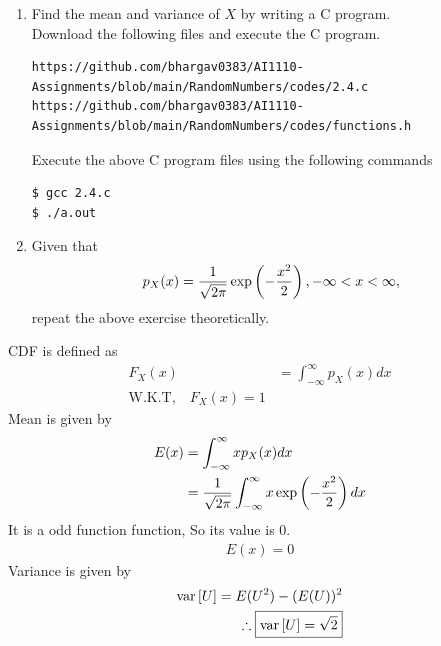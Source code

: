 \documentclass[journal,12pt,twocolumn]{IEEEtran}
\begin{document}
\begin{enumerate}[label=\thesection.\arabic*
,ref=\thesection.\theenumi]
\item Find the mean and variance of $X$ by writing a C program.\\
\solution Download the following files and execute the  C program.
\begin{lstlisting}
https://github.com/bhargav0383/AI1110-Assignments/blob/main/RandomNumbers/codes/2.4.c
https://github.com/bhargav0383/AI1110-Assignments/blob/main/RandomNumbers/codes/functions.h
\end{lstlisting}
Execute the above C program files using the following commands
\begin{lstlisting}
$ gcc 2.4.c
$ ./a.out
\end{lstlisting}

\item Given that 
\begin{align}
p_{X}(x) = \frac{1}{\sqrt{2\pi}}\exp\left(-\frac{x^2}{2}\right), -\infty < x < \infty,
\end{align}
repeat the above exercise theoretically.
\end{enumerate}
\solution 
CDF is defined as
    \begin{align}
        F_X(x)&=\int_{-\infty}^{\infty}p_X(x)dx\\
        \text{W.K.T,} \quad \boxed{F_X(x)=1}
    \end{align}
Mean is given by
    \begin{align}
        E(x)&=\int_{-\infty}^{\infty}xp_X(x)dx\\\
            &=\frac{1}{\sqrt{2\pi}}\int_{-\infty}^{\infty}x\exp\left(-\frac{x^2}{2}\right)dx
    \end{align}
    It is a odd function function, So its value is 0.
    \begin{align}
        \boxed{E(x)=0}
    \end{align}
Variance is given by
    \begin{align}
        \text{var}{}\left[U\right]=E(U^2)-(E(U))^2\\
        \therefore \boxed{\text{var}{}\left[U\right]=\sqrt{2}}
    \end{align}


\end{document}
